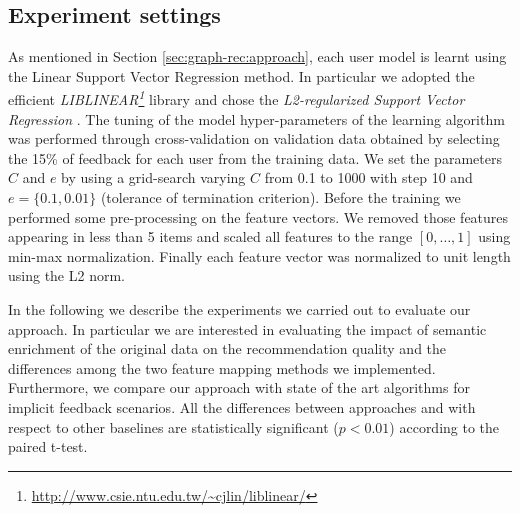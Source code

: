 \subsection{Experiment settings}
As mentioned in Section \ref{sec:graph-rec:approach}, each user model is learnt using the Linear Support Vector Regression method. In particular we adopted the efficient \textit{LIBLINEAR\footnote{\url{http://www.csie.ntu.edu.tw/~cjlin/liblinear/}}} library and chose the \textit{L2-regularized Support Vector Regression} \citep{HoL12}. 
The tuning of the model hyper-parameters of the learning algorithm was performed through cross-validation on validation data obtained by selecting the 15\% of feedback for each user from the training data. We set the parameters $C$ and $e$ by using a grid-search varying $C$ from 0.1 to 1000 with step 10 and $e=\lbrace 0.1,0.01 \rbrace$ (tolerance of termination criterion). Before the training we performed some pre-processing on the feature vectors. We removed those features appearing in less than 5 items and scaled all features to the range $[0,\ldots,1]$ using min-max normalization. Finally each feature vector was normalized to unit length using the L2 norm.


In the following we describe the experiments we carried out to evaluate our approach. In particular we are interested in evaluating the impact of semantic enrichment of the original data on the recommendation quality and the differences among the two feature mapping methods we implemented. Furthermore, we compare our approach with state of the art algorithms for implicit feedback scenarios. 
All the differences between approaches and with respect to other baselines are statistically significant ($p<0.01$) according to the paired t-test.


